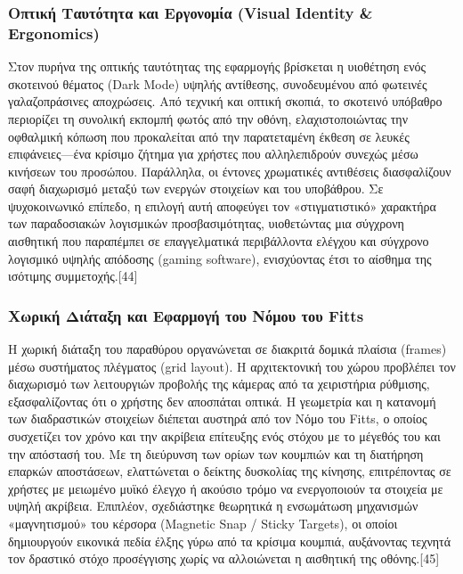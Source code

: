 \documentclass[twoside, a4paper, 11pt]{article}
\begin{document}
\subsubsection{Οπτική Ταυτότητα και Εργονομία (Visual Identity \& Ergonomics)}
Στον πυρήνα της οπτικής ταυτότητας της εφαρμογής βρίσκεται η υιοθέτηση ενός σκοτεινού θέματος (Dark Mode) υψηλής αντίθεσης, 
συνοδευμένου από φωτεινές γαλαζοπράσινες αποχρώσεις. Από τεχνική και οπτική σκοπιά, το σκοτεινό υπόβαθρο περιορίζει τη συνολική εκπομπή φωτός από την οθόνη, 
ελαχιστοποιώντας την οφθαλμική κόπωση που προκαλείται από την παρατεταμένη έκθεση σε λευκές επιφάνειες—ένα κρίσιμο ζήτημα για χρήστες που αλληλεπιδρούν συνεχώς μέσω κινήσεων 
του προσώπου. Παράλληλα, οι έντονες χρωματικές αντιθέσεις διασφαλίζουν σαφή διαχωρισμό μεταξύ των ενεργών στοιχείων και του υποβάθρου. Σε ψυχοκοινωνικό επίπεδο, 
η επιλογή αυτή αποφεύγει τον «στιγματιστικό» χαρακτήρα των παραδοσιακών λογισμικών προσβασιμότητας, υιοθετώντας μια σύγχρονη αισθητική που παραπέμπει σε επαγγελματικά περιβάλλοντα 
ελέγχου και σύγχρονο λογισμικό υψηλής απόδοσης (gaming software), ενισχύοντας έτσι το αίσθημα της ισότιμης συμμετοχής.[44]

\subsubsection{Χωρική Διάταξη και Εφαρμογή του Νόμου του Fitts}
Η χωρική διάταξη του παραθύρου οργανώνεται σε διακριτά δομικά πλαίσια (frames) μέσω συστήματος πλέγματος (grid layout). 
Η αρχιτεκτονική του χώρου προβλέπει τον διαχωρισμό των λειτουργιών προβολής της κάμερας από τα χειριστήρια ρύθμισης, εξασφαλίζοντας ότι ο χρήστης δεν αποσπάται οπτικά. 
Η γεωμετρία και η κατανομή των διαδραστικών στοιχείων διέπεται αυστηρά από τον Νόμο του Fitts, ο οποίος συσχετίζει τον χρόνο και την ακρίβεια επίτευξης ενός στόχου με το μέγεθός 
του και την απόστασή του. Με τη διεύρυνση των ορίων των κουμπιών και τη διατήρηση επαρκών αποστάσεων, ελαττώνεται ο δείκτης δυσκολίας της κίνησης, επιτρέποντας σε χρήστες με μειωμένο 
μυϊκό έλεγχο ή ακούσιο τρόμο να ενεργοποιούν τα στοιχεία με υψηλή ακρίβεια. Επιπλέον, σχεδιάστηκε θεωρητικά η ενσωμάτωση μηχανισμών «μαγνητισμού» του 
κέρσορα (Magnetic Snap / Sticky Targets), οι οποίοι δημιουργούν εικονικά πεδία έλξης γύρω από τα κρίσιμα κουμπιά, αυξάνοντας τεχνητά τον δραστικό στόχο προσέγγισης 
χωρίς να αλλοιώνεται η αισθητική της οθόνης.[45]
\end{document}
